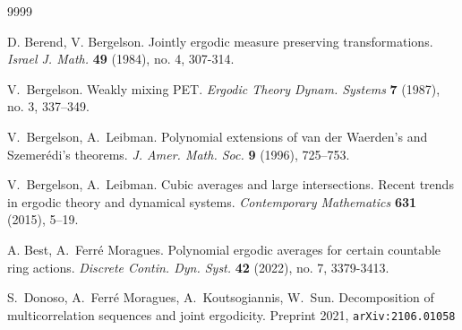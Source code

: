 \documentclass[11pt]{amsart}
\theoremstyle{definition}
\begin{document}
	 \begin{thebibliography}{9999}
	
	 	
	 	
	 	
	 	
	
	     D. Berend, V. Bergelson. Jointly ergodic measure preserving transformations. \emph{Israel J. Math.} \textbf{49} (1984), no. 4, 307-314.
	
	 	 V.~Bergelson. Weakly mixing PET. {\em Ergodic Theory
	 	Dynam. Systems} \textbf{7} (1987), no. 3, 337--349.

 	
	 	
	 	
	 	
	 	V.~Bergelson, A.~Leibman. Polynomial extensions of van der
	 	Waerden's and Szemer\'edi's theorems.  {\em J. Amer. Math. Soc.}
	 	\textbf{9} (1996), 725--753.
	 	
	 	  V.~Bergelson, A.~Leibman. Cubic averages and large intersections. Recent trends in ergodic theory and dynamical systems. {\em Contemporary Mathematics} \textbf{631} (2015),  5--19.
	 	
	 	
	
	
	  A. Best, A.~Ferr\'e Moragues.
	Polynomial ergodic averages for certain countable ring actions.
	{\em Discrete Contin. Dyn. Syst.} {\bf 42} (2022), no. 7, 3379-3413.
	
	 S.~Donoso, A.~Ferr\'e Moragues, A.~Koutsogiannis, W.~Sun.
	Decomposition of multicorrelation sequences and joint ergodicity. Preprint 2021,  \texttt{arXiv:2106.01058}
	

\end{thebibliography}
\end{document}
